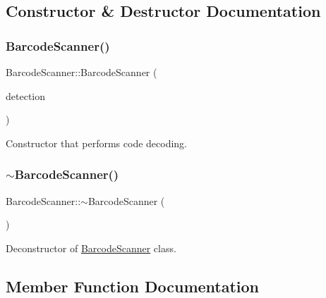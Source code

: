 \subsection{Constructor \& Destructor Documentation}
\mbox{\label{class_barcode_scanner_a75a2c1664c6fae1af960db85e4a118c1}} 
\subsubsection{\texorpdfstring{Barcode\+Scanner()}{BarcodeScanner()}}
{\footnotesize\ttfamily Barcode\+Scanner\+::\+Barcode\+Scanner (\begin{DoxyParamCaption}\item[{\hyperlink{struct_chessboard_detector_result}{Chessboard\+Detector\+Result}}]{detection }\end{DoxyParamCaption})}



Constructor that performs code decoding. 

\mbox{\label{class_barcode_scanner_a8a9f32500c2e83547fd5cdce8450634a}} 
\subsubsection{\texorpdfstring{$\sim$\+Barcode\+Scanner()}{~BarcodeScanner()}}
{\footnotesize\ttfamily Barcode\+Scanner\+::$\sim$\+Barcode\+Scanner (\begin{DoxyParamCaption}{ }\end{DoxyParamCaption})\hspace{0.3cm}{\ttfamily [inline]}}



Deconstructor of \hyperlink{class_barcode_scanner}{Barcode\+Scanner} class. 



\subsection{Member Function Documentation}
\mbox{\label{class_barcode_scanner_a33b8ce809789f70f0c5b63447175d218}} 
